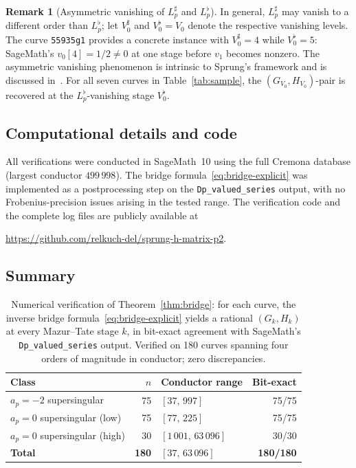 \documentclass[11pt,a4paper]{amsart}
\theoremstyle{definition}
\newtheorem{remark}[theorem]{Remark}
\begin{document}
\begin{remark}[Asymmetric vanishing of $L_p^\sharp$ and $L_p^\flat$]\label{rem:V0-asymmetry}
In general, $L_p^\sharp$ may vanish to a different order than $L_p^\flat$; let $V_0^\sharp$ and $V_0^\flat = V_0$ denote the respective vanishing levels. The curve \texttt{55935g1} provides a concrete instance with $V_0^\sharp = 4$ while $V_0^\flat = 5$: SageMath's $v_0[4] = 1/2 \neq 0$ at one stage before $v_1$ becomes nonzero. The asymmetric vanishing phenomenon is intrinsic to Sprung's framework and is discussed in~\cite[Section~6]{Sprung2012}. For all seven curves in Table~\ref{tab:sample}, the $(G_{V_0}, H_{V_0})$-pair is recovered at the $L_p^\flat$-vanishing stage $V_0^\flat$.
\end{remark}

\subsection{Computational details and code}

All verifications were conducted in SageMath~10 using the full Cremona database (largest conductor $499\,998$). The bridge formula~\eqref{eq:bridge-explicit} was implemented as a postprocessing step on the \texttt{Dp\_valued\_series} output, with no Frobenius-precision issues arising in the tested range. The verification code and the complete log files are publicly available at
\begin{center}
\url{https://github.com/relkuch-del/sprung-h-matrix-p2}.
\end{center}

\subsection{Summary}

\begin{table}[h]
\centering
\begin{tabular}{l|r|l|r}
Class & $n$ & Conductor range & Bit-exact \\
\hline
$a_p = -2$ supersingular & 75 & $[37,\,997]$ & 75/75 \\
$a_p = 0$ supersingular (low)  & 75 & $[77,\,225]$ & 75/75 \\
$a_p = 0$ supersingular (high) & 30 & $[1\,001,\,63\,096]$ & 30/30 \\
\hline
\textbf{Total} & \textbf{180} & $[37,\,63\,096]$ & \textbf{180/180} \\
\end{tabular}
\caption{Numerical verification of Theorem~\ref{thm:bridge}: for each curve, the inverse bridge formula~\eqref{eq:bridge-explicit} yields a rational $(G_k, H_k)$ at every Mazur--Tate stage $k$, in bit-exact agreement with SageMath's \texttt{Dp\_valued\_series} output. Verified on 180 curves spanning four orders of magnitude in conductor; zero discrepancies.}
\label{tab:bilanz}
\end{table}
\end{document}
